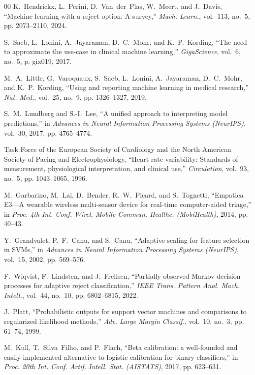 \documentclass[conference]{IEEEtran}
\begin{document}
\begin{thebibliography}{00}
K.~Hendrickx, L.~Perini, D.~Van~der~Plas, W.~Meert, and J.~Davis, ``Machine learning with a reject option: A survey,'' \textit{Mach. Learn.}, vol.~113, no.~5, pp. 2073--2110, 2024.

S.~Saeb, L.~Lonini, A.~Jayaraman, D.~C.~Mohr, and K.~P.~Kording, ``The need to approximate the use-case in clinical machine learning,'' \textit{GigaScience}, vol.~6, no.~5, p. gix019, 2017.

M.~A.~Little, G.~Varoquaux, S.~Saeb, L.~Lonini, A.~Jayaraman, D.~C.~Mohr, and K.~P.~Kording, ``Using and reporting machine learning in medical research,'' \textit{Nat. Med.}, vol.~25, no.~9, pp. 1326--1327, 2019.

S.~M.~Lundberg and S.-I.~Lee, ``A unified approach to interpreting model predictions,'' in \textit{Advances in Neural Information Processing Systems (NeurIPS)}, vol.~30, 2017, pp. 4765--4774.

Task Force of the European Society of Cardiology and the North American Society of Pacing and Electrophysiology, ``Heart rate variability: Standards of measurement, physiological interpretation, and clinical use,'' \textit{Circulation}, vol.~93, no.~5, pp. 1043--1065, 1996.

M.~Garbarino, M.~Lai, D.~Bender, R.~W.~Picard, and S.~Tognetti, ``Empatica E3---A wearable wireless multi-sensor device for real-time computer-aided triage,'' in \textit{Proc. 4th Int. Conf. Wirel. Mobile Commun. Healthc. (MobiHealth)}, 2014, pp. 40--43.

Y.~Grandvalet, P.~F.~Canu, and S.~Canu, ``Adaptive scaling for feature selection in SVMs,'' in \textit{Advances in Neural Information Processing Systems (NeurIPS)}, vol.~15, 2002, pp. 569--576.

F.~Wiqvist, F.~Lindsten, and J.~Frellsen, ``Partially observed Markov decision processes for adaptive reject classification,'' \textit{IEEE Trans. Pattern Anal. Mach. Intell.}, vol.~44, no.~10, pp. 6802--6815, 2022.

J.~Platt, ``Probabilistic outputs for support vector machines and comparisons to regularized likelihood methods,'' \textit{Adv. Large Margin Classif.}, vol.~10, no.~3, pp. 61--74, 1999.

M.~Kull, T.~Silva~Filho, and P.~Flach, ``Beta calibration: a well-founded and easily implemented alternative to logistic calibration for binary classifiers,'' in \textit{Proc. 20th Int. Conf. Artif. Intell. Stat. (AISTATS)}, 2017, pp. 623--631.


\end{thebibliography}
\end{document}
